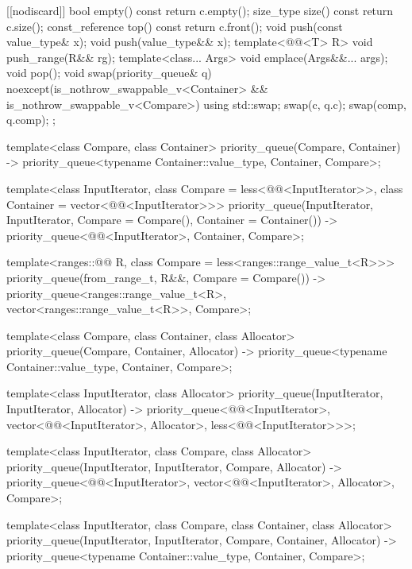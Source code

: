 \begin{codeblock}
{{    [[nodiscard]] bool empty() const { return c.empty(); }
    size_type size()  const          { return c.size(); }
    const_reference   top() const    { return c.front(); }
    void push(const value_type& x);
    void push(value_type&& x);
    template<@@<T> R>
      void push_range(R&& rg);
    template<class... Args> void emplace(Args&&... args);
    void pop();
    void swap(priority_queue& q) noexcept(is_nothrow_swappable_v<Container> &&
                                          is_nothrow_swappable_v<Compare>)
      { using std::swap; swap(c, q.c); swap(comp, q.comp); }
  };

  template<class Compare, class Container>
    priority_queue(Compare, Container)
      -> priority_queue<typename Container::value_type, Container, Compare>;

  template<class InputIterator,
           class Compare = less<@@<InputIterator>>,
           class Container = vector<@@<InputIterator>>>
    priority_queue(InputIterator, InputIterator, Compare = Compare(), Container = Container())
      -> priority_queue<@@<InputIterator>, Container, Compare>;

  template<ranges::@@ R, class Compare = less<ranges::range_value_t<R>>>
    priority_queue(from_range_t, R&&, Compare = Compare())
      -> priority_queue<ranges::range_value_t<R>, vector<ranges::range_value_t<R>>, Compare>;

  template<class Compare, class Container, class Allocator>
    priority_queue(Compare, Container, Allocator)
      -> priority_queue<typename Container::value_type, Container, Compare>;

  template<class InputIterator, class Allocator>
    priority_queue(InputIterator, InputIterator, Allocator)
      -> priority_queue<@@<InputIterator>,
                        vector<@@<InputIterator>, Allocator>,
                        less<@@<InputIterator>>>;

  template<class InputIterator, class Compare, class Allocator>
    priority_queue(InputIterator, InputIterator, Compare, Allocator)
      -> priority_queue<@@<InputIterator>,
                        vector<@@<InputIterator>, Allocator>, Compare>;

  template<class InputIterator, class Compare, class Container, class Allocator>
    priority_queue(InputIterator, InputIterator, Compare, Container, Allocator)
      -> priority_queue<typename Container::value_type, Container, Compare>;

}
\end{codeblock}
